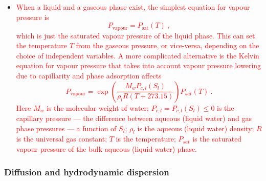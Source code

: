 \documentclass[12pt]{report}
\begin{document}
\begin{itemize}
\item \textcolor{red}{When a liquid and a gaseous phase exist, the
  simplest equation for vapour pressure is
\begin{equation}
P_{\mathrm{vapour}} = P_{\mathrm{sat}}(T) \ ,
\end{equation}
which is just the saturated vapour pressure of the liquid phase.  This
can set the temperature $T$ from the gaseous pressure, or vice-versa,
depending on the choice of independent variables.  A more complicated
alternative is the Kelvin equation for vapour pressure that takes into
account vapour pressure lowering due to capillarity and phase
adsorption affects
\begin{equation}
P_{\mathrm{vapour}} = \exp\left( \frac{M_{w}P_{c,l}(S_{l})}{\rho_{l}R(T+273.15)} \right)
P_{sat}(T) \ .
\label{vap.p.eqn}
\end{equation}
Here $M_{w}$ is the molecular weight of water; $P_{c,l}=
P_{c,l}(S_{l})\leq 0$ is the capillary pressure --- the difference
between aqueous (liquid water) and gas phase pressures --- a function
of $S_{l}$; $\rho_{l}$ is the aqueous (liquid water) density; $R$ is
the universal gas constant; $T$ is the temperature; $P_{sat}$ is the
saturated vapour pressure of the bulk aqueous (liquid water) phase.}
\end{itemize}


\subsubsection{Diffusion and hydrodynamic dispersion}
\end{document}

